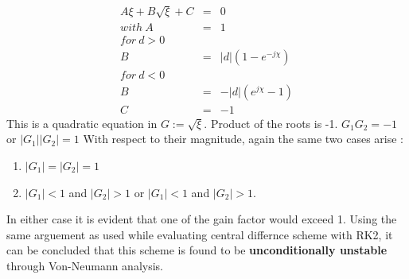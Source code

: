 \documentclass[a4paper,12pt]{report}
\begin{document}
\begin{eqnarray*}
A\xi + B\sqrt{\xi} + C &=&0 \\
with\ A &=& 1 \\
for\  d>0 \\ B &=& |d|(1-e^{-j\chi}) \\
for\  d<0 \\B &=& -|d|(e^{j\chi} -1) \\
C &=& -1
\end{eqnarray*}
This is a quadratic equation in $G := \sqrt{\xi}$. Product of the roots is -1. \newline
$G_1G_2 = -1$ or $|G_1||G_2| = 1$
With respect to their magnitude, again the same two cases arise :
\begin{enumerate}
\item $|G_1|=|G_2|=1$
\item $|G_1|<1$ and $|G_2|> 1$ or $|G_1|<1$ and $|G_2|> 1$. 
\end{enumerate}
In either case it is evident that one of the gain factor would exceed 1. Using the same arguement as used while evaluating central differnce scheme with RK2, it can be concluded that this scheme is found to be \textbf{unconditionally unstable} through Von-Neumann analysis.
\end{document}
